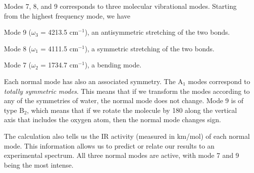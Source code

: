 \documentclass[../Main/notes.tex]{subfiles}
\begin{document}
Modes 7, 8, and 9 corresponds to three molecular vibrational modes.
Starting from the highest frequency mode, we have
\begin{myitems}
\item  Mode 9 ($\omega_3$ = 4213.5 cm$^{-1}$), an antisymmetric stretching of the two  bonds.
\item Mode 8 ($\omega_1$ = 4111.5 cm$^{-1}$), a symmetric stretching of the two  bonds.
\item Mode 7 ($\omega_2$ = 1734.7 cm$^{-1}$), a  bending mode. 
\end{myitems}
Each normal mode has also an associated symmetry. The A$_1$ modes correspond to \emph{totally symmetric modes}.
This means that if we transform the modes according to any of the symmetries of water, the normal mode does not change.
Mode 9 is of type B$_2$, which means that if we rotate the molecule by 180\textdegree{} along the vertical axis that includes the oxygen atom, then the normal mode changes sign.

The calculation also tells us the IR activity (measured in km/mol) of each normal mode. This information allows us to predict or relate our results to an experimental spectrum. All three normal modes are active, with mode 7 and 9 being the most intense.
\end{document}
